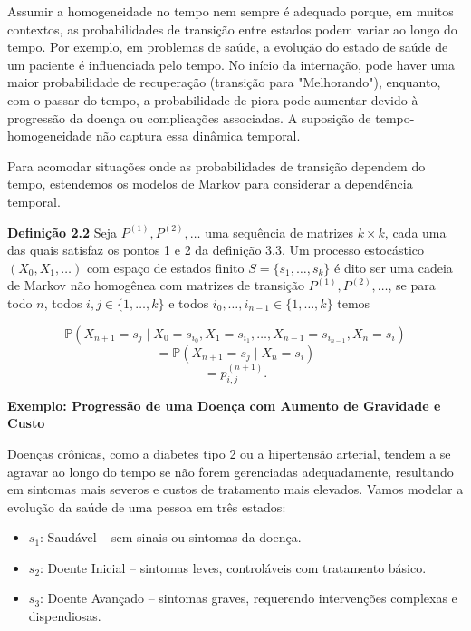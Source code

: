 \documentclass[12pt, a4paper, openany]{book}
\numberwithin{equation}{chapter}
\numberwithin{table}{chapter}
\numberwithin{figure}{chapter}
\theoremstyle{break}
\begin{document}
Assumir a homogeneidade no tempo nem sempre é adequado porque, em muitos contextos, as probabilidades de transição entre estados podem variar ao longo do tempo. Por exemplo, em problemas de saúde, a evolução do estado de saúde de um paciente é influenciada pelo tempo. No início da internação, pode haver uma maior probabilidade de recuperação (transição para "Melhorando"), enquanto, com o passar do tempo, a probabilidade de piora pode aumentar devido à progressão da doença ou complicações associadas. A suposição de tempo-homogeneidade não captura essa dinâmica temporal.


Para acomodar situações onde as probabilidades de transição dependem do tempo, estendemos os modelos de Markov para considerar a dependência temporal.


\textbf{Definição 2.2} Seja $P^{(1)}, P^{(2)}, \dots$ uma sequência de matrizes $k \times k$, cada uma das quais satisfaz os pontos 1 e 2 da definição 3.3. Um processo estocástico $(X_0, X_1, \dots)$ com espaço de estados finito $S = \{s_1, \dots, s_k\}$ é dito ser uma cadeia de Markov não homogênea com matrizes de transição $P^{(1)}, P^{(2)}, \dots$, se para todo $n$, todos $i, j \in \{1, \dots, k\}$ e todos $i_0, \dots, i_{n-1} \in \{1, \dots, k\}$ temos

\[
\mathbb{P}(X_{n+1} = s_j \mid X_0 = s_{i_0}, X_1 = s_{i_1}, \dots, X_{n-1} = s_{i_{n-1}}, X_n = s_i)
\]
\[
= \mathbb{P}(X_{n+1} = s_j \mid X_n = s_i)
\]
\[
= p^{(n+1)}_{i,j}.
\]



\textbf{Exemplo: Progressão de uma Doença com Aumento de Gravidade e Custo}


Doenças crônicas, como a diabetes tipo 2 ou a hipertensão arterial, tendem a se agravar ao longo do tempo se não forem gerenciadas adequadamente, resultando em sintomas mais severos e custos de tratamento mais elevados. Vamos modelar a evolução da saúde de uma pessoa em três estados:


\begin{itemize}
    \item \( s_1 \): Saudável – sem sinais ou sintomas da doença.

    \item \( s_2 \): Doente Inicial – sintomas leves, controláveis com tratamento básico.

    \item \( s_3 \): Doente Avançado – sintomas graves, requerendo intervenções complexas e dispendiosas.
\end{itemize}
\end{document}
